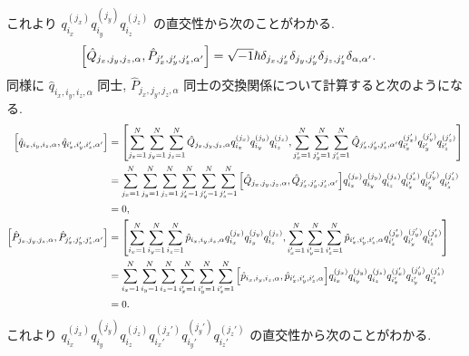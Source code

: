 \documentclass[uplatex,dvipdfmx,a4paper,11pt]{jlreq}
\theoremstyle{definition}
\begin{document}
これより $q_{i_x}^{(j_x)}q_{i_y}^{(j_y)}q_{i_z}^{(j_z)}$ の直交性から次のことがわかる.
\begin{align}
  \qty[\hat{Q}_{j_x,j_y,j_z,\alpha}, \hat{P}_{j_x',j_y',j_z',\alpha'}] & = \sqrt{-1}\hbar\delta_{j_x,j_x'}\delta_{j_y,j_y'}\delta_{j_z,j_z'}\delta_{\alpha,\alpha'}.
\end{align}
同様に $\hat{q}_{i_x,i_y,i_z,\alpha}$ 同士, $\hat{P}_{j_x,j_y,j_z,\alpha}$ 同士の交換関係について計算すると次のようになる.
\begin{align}
  \qty[\hat{q}_{i_x,i_y,i_z,\alpha}, \hat{q}_{i_x',i_y',i_z',\alpha'}] & = \qty[\sum_{j_x=1}^{N}\sum_{j_y=1}^{N}\sum_{j_z=1}^{N}\hat{Q}_{j_x,j_y,j_z,\alpha}q_{i_x}^{(j_x)}q_{i_y}^{(j_y)}q_{i_z}^{(j_z)}, \sum_{j_x'=1}^{N}\sum_{j_y'=1}^{N}\sum_{j_z'=1}^{N}\hat{Q}_{j_x',j_y',j_z',\alpha'}q_{i_x'}^{(j_x')}q_{i_y'}^{(j_y')}q_{i_z'}^{(j_z')}] \\
                                                                       & = \sum_{j_x=1}^{N}\sum_{j_y=1}^{N}\sum_{j_z=1}^{N}\sum_{j_x'=1}^{N}\sum_{j_y'=1}^{N}\sum_{j_z'=1}^{N}\qty[\hat{Q}_{j_x,j_y,j_z,\alpha}, \hat{Q}_{j_x',j_y',j_z',\alpha'}]q_{i_x}^{(j_x)}q_{i_y}^{(j_y)}q_{i_z}^{(j_z)}q_{i_x'}^{(j_x')}q_{i_y'}^{(j_y')}q_{i_z'}^{(j_z')} \\
                                                                       & = 0,                                                                                                                                                                                                                                                                      \\
  \qty[\hat{P}_{j_x,j_y,j_z,\alpha}, \hat{P}_{j_x',j_y',j_z',\alpha'}] & = \qty[\sum_{i_x=1}^{N}\sum_{i_y=1}^{N}\sum_{i_z=1}^{N}\hat{p}_{i_x,i_y,i_z,\alpha}q_{i_x}^{(j_x)}q_{i_y}^{(j_y)}q_{i_z}^{(j_z)}, \sum_{i_x'=1}^{N}\sum_{i_y'=1}^{N}\sum_{i_z'=1}^{N}\hat{p}_{i_x',i_y',i_z',\alpha}q_{i_x'}^{(j_x')}q_{i_y'}^{(j_y')}q_{i_z'}^{(j_z')}]  \\
                                                                       & = \sum_{i_x=1}^{N}\sum_{i_y=1}^{N}\sum_{i_z=1}^{N}\sum_{i_x'=1}^{N}\sum_{i_y'=1}^{N}\sum_{i_z'=1}^{N}\qty[\hat{p}_{i_x,i_y,i_z,\alpha}, \hat{p}_{i_x',i_y',i_z',\alpha}]q_{i_x}^{(j_x)}q_{i_y}^{(j_y)}q_{i_z}^{(j_z)}q_{i_x'}^{(j_x')}q_{i_y'}^{(j_y')}q_{i_z'}^{(j_z')}  \\
                                                                       & = 0.
\end{align}
これより $q_{i_x}^{(j_x)}q_{i_y}^{(j_y)}q_{i_z}^{(j_z)}q_{i_x'}^{(j_x')}q_{i_y'}^{(j_y')}q_{i_z'}^{(j_z')}$ の直交性から次のことがわかる.
\end{document}
